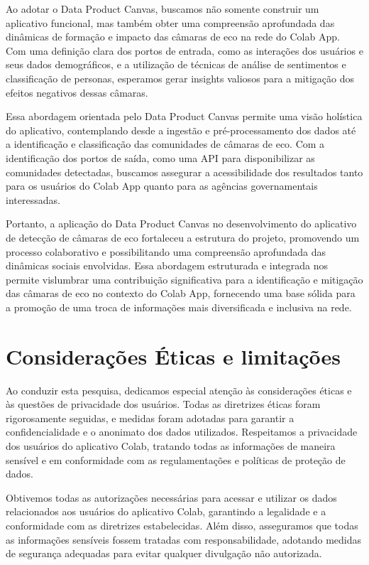 Ao adotar o Data Product Canvas, buscamos não somente construir um aplicativo funcional, mas também obter uma compreensão aprofundada das dinâmicas de formação e impacto das câmaras de eco na rede do Colab App. Com uma definição clara dos portos de entrada, como as interações dos usuários e seus dados demográficos, e a utilização de técnicas de análise de sentimentos e classificação de personas, esperamos gerar insights valiosos para a mitigação dos efeitos negativos dessas câmaras.

Essa abordagem orientada pelo Data Product Canvas permite uma visão holística do aplicativo, contemplando desde a ingestão e pré-processamento dos dados até a identificação e classificação das comunidades de câmaras de eco. Com a identificação dos portos de saída, como uma API para disponibilizar as comunidades detectadas, buscamos assegurar a acessibilidade dos resultados tanto para os usuários do Colab App quanto para as agências governamentais interessadas.

Portanto, a aplicação do Data Product Canvas no desenvolvimento do aplicativo de detecção de câmaras de eco fortaleceu a estrutura do projeto, promovendo um processo colaborativo e possibilitando uma compreensão aprofundada das dinâmicas sociais envolvidas. Essa abordagem estruturada e integrada nos permite vislumbrar uma contribuição significativa para a identificação e mitigação das câmaras de eco no contexto do Colab App, fornecendo uma base sólida para a promoção de uma troca de informações mais diversificada e inclusiva na rede.

\section{Considerações Éticas e limitações}
Ao conduzir esta pesquisa, dedicamos especial atenção às considerações éticas e às questões de privacidade dos usuários. Todas as diretrizes éticas foram rigorosamente seguidas, e medidas foram adotadas para garantir a confidencialidade e o anonimato dos dados utilizados. Respeitamos a privacidade dos usuários do aplicativo Colab, tratando todas as informações de maneira sensível e em conformidade com as regulamentações e políticas de proteção de dados.

Obtivemos todas as autorizações necessárias para acessar e utilizar os dados relacionados aos usuários do aplicativo Colab, garantindo a legalidade e a conformidade com as diretrizes estabelecidas. Além disso, asseguramos que todas as informações sensíveis fossem tratadas com responsabilidade, adotando medidas de segurança adequadas para evitar qualquer divulgação não autorizada.

